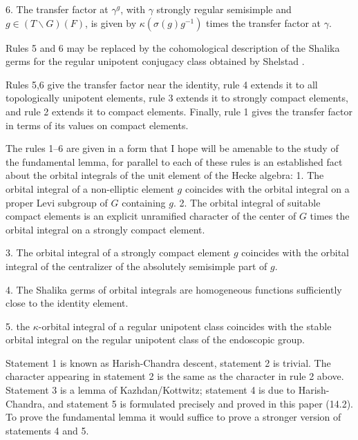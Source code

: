 \documentclass{amsart}
\def\SHELSTAD{24}
\begin{document}
{6.}  The transfer factor at $\gamma^g$, with $\gamma$ strongly regular semisimple
and $g\in (T\backslash G)(F)$, is
given by $\kappa(\sigma(g)g^{-1})$ times the transfer factor at $\gamma$.

Rules 5 and 6 may be replaced by the cohomological description of the 
Shalika germs for the regular unipotent conjugacy class
obtained by Shelstad \cite{\SHELSTAD}.

 Rules 5,6  give the transfer factor near the identity, rule 4 extends 
it to all topologically unipotent elements, rule 3 extends it to 
strongly compact elements, and rule 2 extends it to compact elements.
Finally, rule 1 gives the transfer factor in terms of its values on
compact elements.

The rules 1--6 are given in a form that I hope will be 
amenable to the study of the fundamental lemma,
for parallel to each of these rules is an
established fact about
 the orbital integrals
of the unit element of the Hecke algebra:
{1.}  The orbital integral of a non-elliptic element
$g$ coincides with the orbital integral on a proper Levi
subgroup of $G$ containing $g$.
{2.}  The orbital integral of suitable compact elements is an 
explicit unramified character of the center of $G$
times the orbital integral on a strongly compact element.

{3.} The orbital integral of a strongly compact
element $g$ coincides with the orbital integral of the centralizer
of the absolutely semisimple part of $g$.

{4.}  The Shalika germs of orbital integrals are homogeneous
functions sufficiently close to the identity element.

{5.}  the $\kappa$-orbital integral of a regular unipotent class 
coincides with the stable orbital integral on the regular
unipotent class of the endoscopic group.\par

Statement 1 is known as Harish-Chandra descent, statement 2 is
trivial. The character appearing in statement 2
is the same as the character in rule 2 above.
 Statement 3 is a lemma of Kazhdan/Kottwitz; statement 4 is due to
Harish-Chandra, and statement 5 is formulated precisely and
proved in this paper (14.2).  To prove the fundamental lemma it would suffice
to prove a stronger version of statements 4 and 5.  
\end{document}

